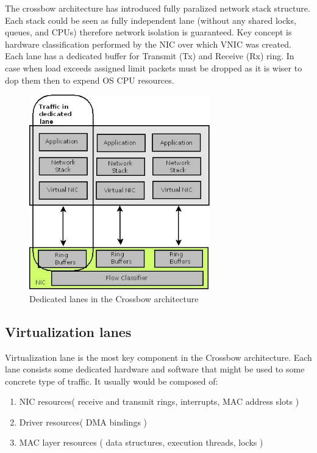 \documentclass[11pt]{book}
\begin{document}
                The crossbow architecture has introduced fully paralized network stack structure. Each stack could be seen as fully independent lane (without
              any shared locks, queues, and CPUs) therefore network isolation is guaranteed. Key concept is
              hardware classification performed by the NIC over which VNIC was created. Each lane has a
              dedicated buffer for Transmit (Tx) and Receive (Rx) ring. In case when load exceeds assigned
              limit packets must be dropped as it is wiser to dop them then to expend OS CPU resources. 

      
                 \begin{figure}[H]
                        \begin{center}
                              \includegraphics[width=0.7\textwidth]{img/crossbow-traffic-dedicated-line.jpeg}
                              \caption{Dedicated lanes in the Crossbow architecture}
                        \end{center}
                 \end{figure}
		
		\subsection{Virtualization lanes}

                        Virtualization lane is the most key component in the Crossbow architecture. Each lane consists some dedicated hardware and software that might be 
			used to some concrete type of traffic. It usually would be composed of: 
			\begin{enumerate}
				\item{NIC resources( receive and transmit rings, interrupts, MAC address slots )}
				\item{Driver resources( DMA bindings )}
				\item{MAC layer resources ( data structures, execution threads, locks )}
			\end{enumerate}
			
\end{document}
